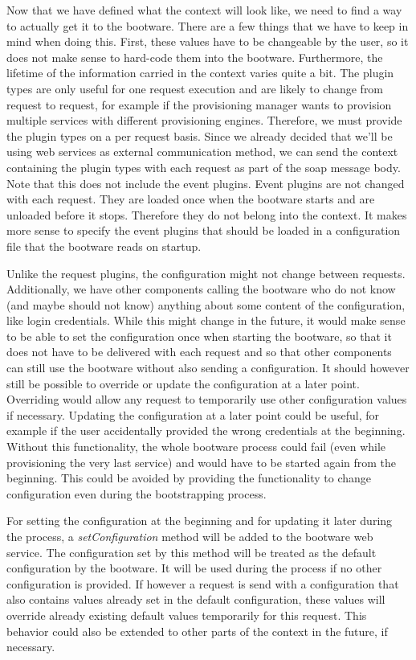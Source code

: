 Now that we have defined what the context will look like, we need to find a way to actually get it to the bootware.
There are a few things that we have to keep in mind when doing this.
First, these values have to be changeable by the user, so it does not make sense to hard-code them into the bootware.
Furthermore, the lifetime of the information carried in the context varies quite a bit.
The plugin types are only useful for one request execution and are likely to change from request to request, for example if the provisioning manager wants to provision multiple services with different provisioning engines.
Therefore, we must provide the plugin types on a per request basis.
Since we already decided that we'll be using web services as external communication method, we can send the context containing the plugin types with each request as part of the soap message body.
Note that this does not include the event plugins.
Event plugins are not changed with each request.
They are loaded once when the bootware starts and are unloaded before it stops.
Therefore they do not belong into the context.
It makes more sense to specify the event plugins that should be loaded in a configuration file that the bootware reads on startup.

Unlike the request plugins, the configuration might not change between requests.
Additionally, we have other components calling the bootware who do not know (and maybe should not know) anything about some content of the configuration, like login credentials.
While this might change in the future, it would make sense to be able to set the configuration once when starting the bootware, so that it does not have to be delivered with each request and so that other components can still use the bootware without also sending a configuration.
It should however still be possible to override or update the configuration at a later point.
Overriding would allow any request to temporarily use other configuration values if necessary.
Updating the configuration at a later point could be useful, for example if the user accidentally provided the wrong credentials at the beginning.
Without this functionality, the whole bootware process could fail (even while provisioning the very last service) and would have to be started again from the beginning.
This could be avoided by providing the functionality to change configuration even during the bootstrapping process.

For setting the configuration at the beginning and for updating it later during the process, a \textit{setConfiguration} method will be added to the bootware web service.
The configuration set by this method will be treated as the default configuration by the bootware.
It will be used during the process if no other configuration is provided.
If however a request is send with a configuration that also contains values already set in the default configuration, these values will override already existing default values temporarily for this request.
This behavior could also be extended to other parts of the context in the future, if necessary.
